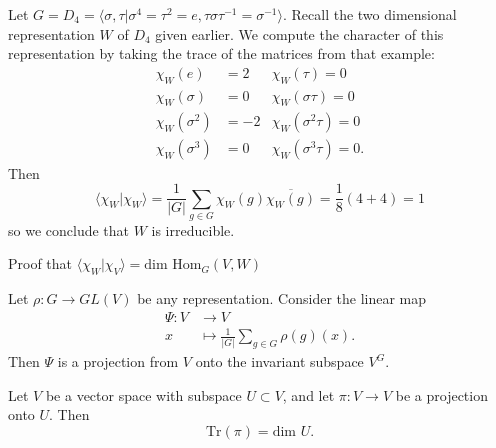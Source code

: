 \begin{frame}
\begin{example}
Let $G=D_4=  \langle \sigma, \tau |  \sigma^4 = \tau^2 = e, \tau \sigma \tau^{-1} = \sigma^{-1} \rangle$.  Recall the two dimensional representation $W$ of $D_4$ given earlier.
We compute the character of this representation by taking the trace of the matrices from that example:
\begin{align*}
\chi_W(e) &=2 & \chi_W(\tau) = 0 \\
\chi_W(\sigma) &= 0 &\chi_W (\sigma \tau) = 0 \\
\chi_W(\sigma^2) &= -2 &\chi_W (\sigma^2 \tau) = 0 \\
\chi_W(\sigma^3) &= 0 &\chi_W (\sigma^3 \tau) = 0.
\end{align*}
Then
\[ \langle \chi_W | \chi_W \rangle =\frac {1}{|G|} \sum_{g \in G} \chi_W (g) \overline{\chi_W (g)} = \frac{1}{8} (4 + 4) = 1\]
so we conclude that $W$ is irreducible.
\end{example}
\end{frame}

\begin{frame}{Proof that $\langle \chi_W | \chi_V \rangle = \text{dim Hom}_G (V,W)$}
\begin{lemma}
Let $\rho \colon G \to GL(V)$ be any representation.  Consider the linear map 
\begin{align*}
\Psi \colon V &\to V \\
x &\mapsto \frac{1}{|G|} \sum_{g \in G} \rho(g)(x).
\end{align*}
Then $\Psi$ is a  projection from $V$ onto the invariant subspace $V^G$.
\end{lemma}
\begin{lemma}
Let $V$ be a vector space with subspace $U \subset V$, and let $\pi \colon V \to V$ be a projection onto $U$.  Then 
\[ \text{Tr}(\pi) = \text{dim } U. \]
\end{lemma}
\end{frame}

